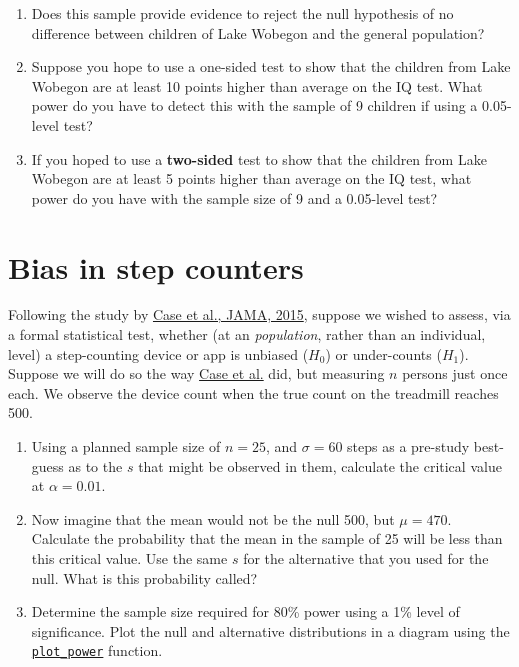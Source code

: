 \documentclass[letterpaper,11pt,twoside,]{pinp}
\providecommand{\tightlist}{%
  \setlength{\itemsep}{0pt}\setlength{\parskip}{0pt}}
\begin{document}
\begin{enumerate}
\def\labelenumi{\alph{enumi})}
\item
  Does this sample provide evidence to reject the null hypothesis of no
  difference between children of Lake Wobegon and the general
  population?
\item
  Suppose you hope to use a one-sided test to show that the children
  from Lake Wobegon are at least 10 points higher than average on the IQ
  test. What power do you have to detect this with the sample of 9
  children if using a 0.05-level test?
\item
  If you hoped to use a \textbf{two-sided} test to show that the
  children from Lake Wobegon are at least 5 points higher than average
  on the IQ test, what power do you have with the sample size of 9 and a
  0.05-level test?
\end{enumerate}

\hypertarget{bias-in-step-counters}{%
\section{Bias in step counters}\label{bias-in-step-counters}}

Following the study by
\href{http://www.medicine.mcgill.ca/epidemiology/hanley/bios601/Surveys/SmartphoneSteps.pdf}{Case
et al., JAMA, 2015}, suppose we wished to assess, via a formal
statistical test, whether (at an \textit{population}, rather than an
individual, level) a step-counting device or app is unbiased (\(H_0\))
or under-counts (\(H_1\)). Suppose we will do so the way
\href{http://www.medicine.mcgill.ca/epidemiology/hanley/bios601/Surveys/SmartphoneSteps.pdf}{Case
et al.} did, but measuring \(n\) persons just once each. We observe the
device count when the true count on the treadmill reaches 500.

\begin{enumerate}
\def\labelenumi{\alph{enumi}.}
\tightlist
\item
  Using a planned sample size of \(n=25\), and \(\sigma = 60\) steps as
  a pre-study best-guess as to the \(s\) that might be observed in them,
  calculate the critical value at \(\alpha = 0.01\).
\item
  Now imagine that the mean would not be the null 500, but \(\mu=470.\)
  Calculate the probability that the mean in the sample of 25 will be
  less than this critical value. Use the same \(s\) for the alternative
  that you used for the null. What is this probability called?
\item
  Determine the sample size required for 80\% power using a 1\% level of
  significance. Plot the null and alternative distributions in a diagram
  using the
  \href{https://raw.githubusercontent.com/sahirbhatnagar/EPIB607/master/inst/code/plot_null_alt.R}{\texttt{plot\_power}}
  function.
\end{enumerate}





\end{document}
